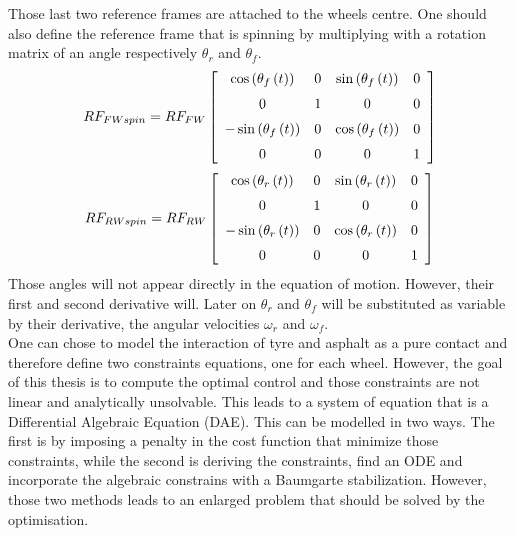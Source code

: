%
Those last two reference frames are attached to the wheels centre. One should also define the reference frame that is spinning by multiplying with a rotation matrix of an angle respectively $\theta_r$ and $\theta_f$.
%
\begin{equation}
    RF_{FWspin} = RF_{FW}
    \left[ \begin {array}{cccc} \cos \left( \theta_{f} \left( t \right) 
    \right) &0&\sin \left( \theta_{f} \left( t \right)  \right) &0
    \\ \noalign{\medskip}0&1&0&0\\ \noalign{\medskip}-\sin \left( \theta_{
    f} \left( t \right)  \right) &0&\cos \left( \theta_{f} \left( t
    \right)  \right) &0\\ \noalign{\medskip}0&0&0&1\end {array} \right]
\end{equation}
%
\begin{equation}
    RF_{RWspin} = RF_{RW}
    \left[ \begin {array}{cccc} \cos \left( \theta_{r} \left( t \right) 
    \right) &0&\sin \left( \theta_{r} \left( t \right)  \right) &0
    \\ \noalign{\medskip}0&1&0&0\\ \noalign{\medskip}-\sin \left( \theta_{
    r} \left( t \right)  \right) &0&\cos \left( \theta_{r} \left( t
    \right)  \right) &0\\ \noalign{\medskip}0&0&0&1\end {array} \right] 
\end{equation}
%
Those angles will not appear directly in the equation of motion. However, their first and second derivative will. Later on $\theta_r$ and $\theta_f$ will be substituted as variable by their derivative, the angular velocities $\omega_r$ and $\omega_f$.\\
One can chose to model the interaction of tyre and asphalt as a pure contact and therefore define two constraints equations, one for each wheel. However, the goal of this thesis is to compute the optimal control and those constraints are not linear and analytically unsolvable. This leads to a system of equation that is a Differential Algebraic Equation (DAE). This can be modelled in two ways. The first is by imposing a penalty in the cost function that minimize those constraints, while the second is deriving the constraints, find an ODE and incorporate the algebraic constrains with a Baumgarte stabilization\cite{baumgarte1972stabilization}. However, those two methods leads to an enlarged problem that should be solved by the optimisation. \\
